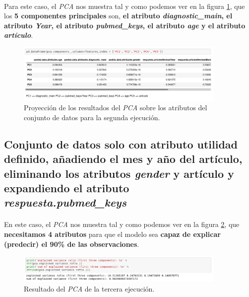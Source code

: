 \paragraph{}
Para este caso, el \textit{PCA} nos muestra tal y como podemos ver en la figura \ref{pcaTwoAtributos}, que los \textbf{5 componentes principales} son, \textbf{el atributo \textit{diagnostic\_main}, el atributo \textit{Year}, el atributo \textit{pubmed\_keys}, el atributo \textit{age} y el atributo \textit{artículo}}.

\begin{figure}[!htb]
  \centering
    \includegraphics[width=0.9\textwidth]{images/resultados_procesado_de_datos_pca2_atributos.png}
    \caption{Proyección de los resultados del \textit{PCA} sobre los atributos del conjunto de datos para la segunda ejecución.}
  \label{pcaTwoAtributos}
\end{figure}

\subsection{Conjunto de datos solo con atributo utilidad definido, añadiendo el mes y año del artículo, eliminando los atributos \textit{gender} y artículo y expandiendo el atributo \textit{respuesta.pubmed\_keys}}
\label{result:pca_case3}
\paragraph{}
En este caso, el \textit{PCA} nos muestra tal y como podemos ver en la figura \ref{pcaThreeResult}, que \textbf{necesitamos 4 atributos} para que el modelo sea \textbf{capaz de explicar (predecir) el 90\% de las observaciones}.

\begin{figure}[!htb]
  \centering
    \includegraphics[width=0.9\textwidth]{images/resultados_procesado_de_datos_pca3_result.png}
    \caption{Resultado del \textit{PCA} de la tercera ejecución.}
  \label{pcaThreeResult}
\end{figure}

